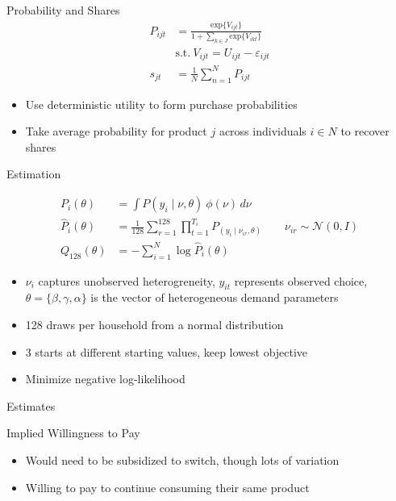 \documentclass[aspectratio=169,professionalfonts]{beamer}
\begin{document}
\begin{frame}{Probability and Shares}
  \begin{align*}
    P_{ijt} &= \frac{\text{exp}\{V_{ijt}\}}{1 + \sum_{k\in J}\text{exp}\{V_{ikt}\}} \\
    &\text{s.t.} \ V_{ijt} = U_{ijt} - \varepsilon_{ijt} \\
    s_{jt} &= \frac{1}{N}\sum_{n=1}^{N}P_{ijt}
  \end{align*}
  \begin{itemize}
    \item Use deterministic utility to form purchase probabilities
    \item Take average probability for product $j$ across individuals $i\in N$ to recover shares 
  \end{itemize}
\end{frame}
\begin{frame}{Estimation}
  \begin{tcolorbox}
    [
    boxsep=0pt,
    left=2pt, right=2pt,
    top=1pt, bottom=1pt,
    before skip=2pt, after skip=2pt
    ]
    \setlength{\abovedisplayskip}{2pt}
    \setlength{\belowdisplayskip}{2pt}
    \begin{align*}
      P_i(\theta) &= \int P(y_i\mid\nu,\theta)\ \phi(\nu)\,d\nu \\
      \widehat P_i(\theta) &= \frac{1}{128}\sum_{r=1}^{128}\prod_{t=1}^{T_i}P_(y_i\mid\nu_{ir}, \theta)\qquad\nu_{ir}\sim\mathcal N(0, I) \\
      Q_{128}(\theta) &= -\sum_{i=1}^N\log\widehat P_i(\theta)
    \end{align*}
  \end{tcolorbox}
  \begin{itemize}
    \item $\nu_i$ captures unobserved heterogreneity, $y_{it}$ represents observed choice, $\theta = \{\beta, \gamma, \alpha\}$ is the vector of heterogeneous demand parameters
    \item 128 draws per household from a normal distribution
    \item 3 starts at different starting values, keep lowest objective 
    \item Minimize negative log-likelihood
  \end{itemize}
\end{frame}
\begin{frame}{Estimates}
  \centering
  
\end{frame}
\begin{frame}{Implied Willingness to Pay}
  \centering
  
  \begin{itemize}
    \item Would need to be subsidized to switch, though lots of variation
    \item Willing to pay to continue consuming their same product
  \end{itemize}
\end{frame}
\end{document}
